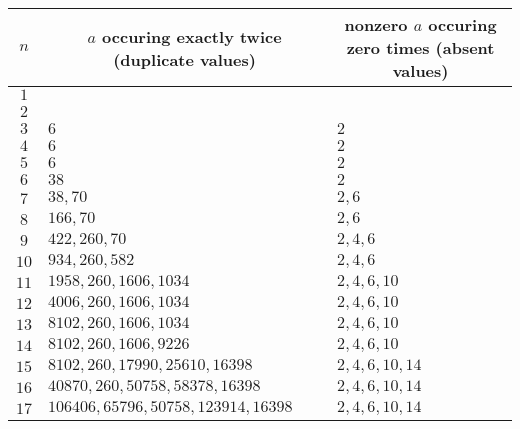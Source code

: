 \documentclass[1gpt]{article}
\theoremstyle{break}
\begin{document}
\begin{itemize}
        \begin{table}[h]
            \centering
            \begin{tabular}{|c|l|l|}
                \hline
                \multicolumn{1}{|c|}{$n$} & \multicolumn{1}{|c|}{$a$ occuring exactly twice (duplicate values)} & \multicolumn{1}{|c|}{nonzero $a$ occuring zero times (absent values)} \\
                \hline
                $1$  &                                                       & \\
                $2$  &                                                       & \\
                $3$  & $6$                                                   & $2$ \\
                $4$  & $6$                                                   & $2$ \\
                $5$  & $6$                                                   & $2$ \\
                $6$  & $38$                                                  & $2$ \\
                $7$  & $38, 70$                                              & $2, 6$ \\
                $8$  & $166, 70$                                             & $2, 6$ \\
                $9$  & $422, 260, 70$                                        & $2, 4, 6$ \\
                $10$ & $934, 260, 582$                                       & $2, 4, 6$ \\
                $11$ & $1958, 260, 1606, 1034$                               & $2, 4, 6, 10$ \\
                $12$ & $4006, 260, 1606, 1034$                               & $2, 4, 6, 10$ \\
                $13$ & $8102, 260, 1606, 1034$                               & $2, 4, 6, 10$ \\
                $14$ & $8102, 260, 1606, 9226$                               & $2, 4, 6, 10$ \\
                $15$ & $8102, 260, 17990, 25610, 16398$                      & $2, 4, 6, 10, 14$ \\
                $16$ & $40870, 260, 50758, 58378, 16398$                     & $2, 4, 6, 10, 14$ \\
                $17$ & $106406, 65796, 50758, 123914, 16398$                 & $2, 4, 6, 10, 14$ \\

\end{tabular}
\end{table}
\end{itemize}
\end{document}
